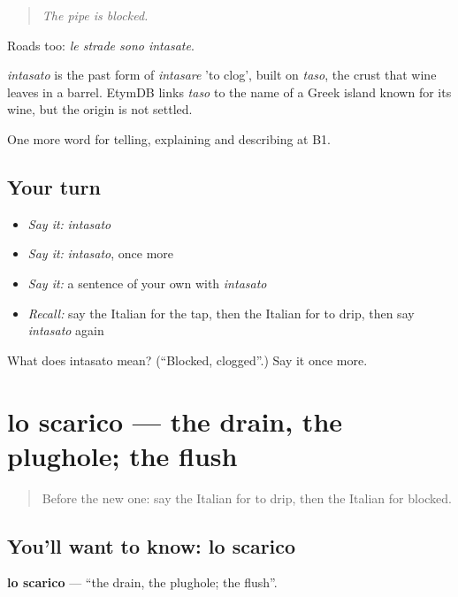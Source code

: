 \begin{quote}
\emph{The pipe is blocked.}
\end{quote}

Roads too: \emph{le strade sono intasate}.

\begin{cousinweb}
\emph{intasato} is the past form of \emph{intasare} 'to clog', built on \emph{taso}, the crust that wine leaves in a barrel. EtymDB links \emph{taso} to the name of a Greek island known for its wine, but the origin is not settled.
\end{cousinweb}

\begin{grammarlens}[title={What you've built}]
One more word for telling, explaining and describing at B1.
\end{grammarlens}

\subsection*{Your turn}
\begin{itemize}
\raggedright
  \item \emph{Say it:} \emph{intasato}
  \item \emph{Say it:} \emph{intasato}, once more
  \item \emph{Say it:} a sentence of your own with \emph{intasato}
  \item \emph{Recall:} say the Italian for the tap, then the Italian for to drip, then say \emph{intasato} again
\end{itemize}

\begin{tcolorbox}[breakable,colback=teal!4,colframe=teal!35!black,title={Before you move on}]
What does intasato mean? (\textquotedblleft{}Blocked, clogged\textquotedblright{}.) Say it once more.
\end{tcolorbox}
\section[lo scarico]{lo scarico — the drain, the plughole; the flush}

\label{lesson:IT-C434-scarico}



\begin{quote}
Before the new one: say the Italian for to drip, then the Italian for blocked.
\end{quote}

\subsection*{You'll want to know: lo scarico}
\textbf{lo scarico} — \textquotedblleft{}the drain, the plughole; the flush\textquotedblright{}.

